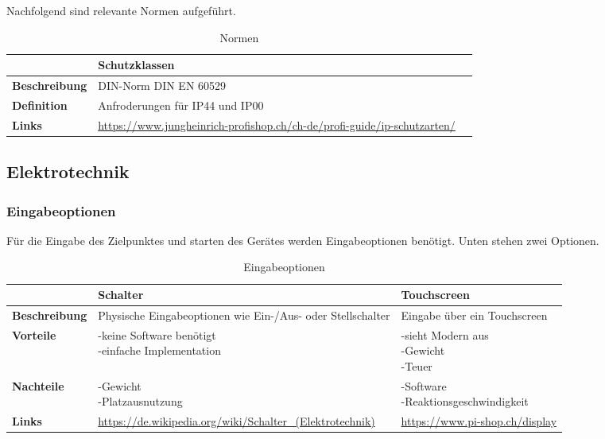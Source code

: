 Nachfolgend sind relevante Normen aufgeführt.

\begin{table}[H]
\centering
\small
\begin{tabularx}{\textwidth}{|l|X|X|}
\hline
\textbf{} & \textbf{Schutzklassen} & \textbf{}\\
  \hline
  \textbf{Beschreibung}&     DIN-Norm DIN EN 60529       &           \\
  \hline
  \textbf{Definition}&       Anfroderungen für IP44 und IP00      &           \\
  \hline
  \textbf{Links}&    \url{https://www.jungheinrich-profishop.ch/ch-de/profi-guide/ip-schutzarten/}       &               \\
  \hline
\end{tabularx}
\caption{Normen}
\label{table:norms}
\end{table}



\newpage
\subsection{Elektrotechnik}

\subsubsection{Eingabeoptionen}

Für die Eingabe des Zielpunktes und starten des Gerätes werden Eingabeoptionen benötigt. Unten stehen zwei Optionen.

\begin{table}[H]
\centering
\small
\begin{tabularx}{\textwidth}{|l|X|X|}
\hline
  \textbf{} & \textbf{Schalter} & \textbf{Touchscreen} \\
  \hline
  \textbf{Beschreibung}  & Physische Eingabeoptionen wie Ein-/Aus- oder Stellschalter & Eingabe über ein Touchscreen\\
  \hline
  \textbf{Vorteile}  & \makecell{-keine Software benötigt\\-einfache Implementation} & \makecell{-sieht Modern aus \\ -Gewicht \\-Teuer}\\
  \hline
  \textbf{Nachteile} & \makecell{-Gewicht \\-Platzausnutzung} & \makecell{-Software\\-Reaktionsgeschwindigkeit}\\
  \hline
  \textbf{Links} &  \url{https://de.wikipedia.org/wiki/Schalter_(Elektrotechnik)} & \url{https://www.pi-shop.ch/display}\\
  \hline
\end{tabularx}
\caption{Eingabeoptionen}
\label{table:inputs-compare}
\end{table}

